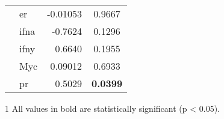 \begin{table}[htpb]
\begin{threeparttable}
\begin{tabular}{llrc}
                                                                           & \gls{er}   & -0.01053   & 0.9667 \\
                                                                           & \gls{ifna} & -0.7624    & 0.1296 \\
                                                                           & \gls{ifny} & 0.6640     & 0.1955 \\
                                                                           & Myc        & 0.09012    & 0.6933 \\
                                                                           & \gls{pr}   & 0.5029     & \bfseries 0.0399  \\
				\hline
				\hline
			\end{tabular}
			\begin{tablenotes}
				\begin{footnotesize}
				\item [1] All values in bold are statistically significant (p \textless{} 0.05).
				\end{footnotesize}
			\end{tablenotes}
		\end{threeparttable}
	\end{table}


